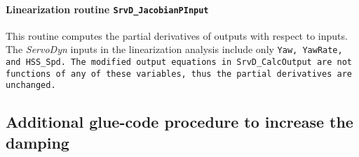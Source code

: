 \documentclass[11pt]{article}
\begin{document}
\paragraph{Linearization routine \tt{SrvD\_JacobianPInput}}
This routine computes the partial derivatives of outputs with respect to inputs. The \textit{ServoDyn} inputs in the linearization analysis
include only \tt{Yaw}, \tt{YawRate}, and \tt{HSS\_Spd}. The modified output equations in \tt{SrvD\_CalcOutput} are not functions of 
any of these variables, thus the partial derivatives are unchanged.

% 
% 
% 
% 
% 
% 






\subsection{Additional glue-code procedure to increase the damping}
\end{document}

